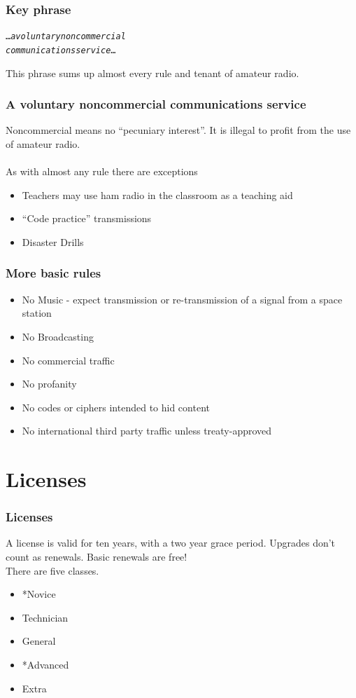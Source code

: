 \documentclass[10pt]{beamer}
\begin{document}
\begin{frame}
\frametitle{Key phrase}
\begin{alltt}
\ldots\emph{a voluntary noncommercial\\communications service}\ldots
\end{alltt}
This phrase sums up almost every rule and tenant of amateur radio.
\end{frame}

\begin{frame}
\frametitle{A voluntary noncommercial communications service}
Noncommercial means no ``pecuniary interest''. It is illegal to profit from the use of amateur radio.\\
\hfil \\As with almost any rule there are exceptions
\begin{itemize}
\item Teachers may use ham radio in the classroom as a teaching aid
\item ``Code practice'' transmissions
\item Disaster Drills
\end{itemize}
\end{frame}

\begin{frame}
\frametitle{More basic rules}
\begin{itemize}
\item No Music - expect transmission or re-transmission of a signal from a space station
\item No Broadcasting
\item No commercial traffic
\item No profanity
\item No codes or ciphers intended to hid content
\item No international third party traffic unless treaty-approved
\end{itemize}
\end{frame}

\section{Licenses}

\begin{frame}
\frametitle{Licenses}
A license is valid for ten years, with a two year grace period. Upgrades don't count as renewals. Basic renewals are free!\\
There are five classes.
\begin{itemize}
\item *Novice
\item Technician
\item General
\item *Advanced
\item Extra
\end{itemize}
\end{frame}
\end{document}
